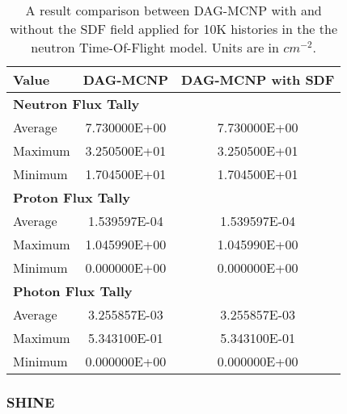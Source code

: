   \begin{table}[H]
    \small
    \begin{center}
      \begin{tabular}{lcc}
        \toprule
        Value   & DAG-MCNP     & DAG-MCNP with SDF      \\
        \toprule
        \multicolumn{3}{l}{\textbf{Neutron Flux Tally}} \\
        Average & 7.730000E+00 & 7.730000E+00           \\
        Maximum & 3.250500E+01 & 3.250500E+01           \\
        Minimum & 1.704500E+01 & 1.704500E+01           \\
        \multicolumn{3}{l}{\textbf{Proton Flux Tally}}  \\
        Average & 1.539597E-04 & 1.539597E-04           \\
        Maximum & 1.045990E+00 & 1.045990E+00           \\
        Minimum & 0.000000E+00 & 0.000000E+00           \\
        \multicolumn{3}{l}{\textbf{Photon Flux Tally}}  \\
        Average & 3.255857E-03 & 3.255857E-03           \\
        Maximum & 5.343100E-01 & 5.343100E-01           \\
        Minimum & 0.000000E+00 & 0.000000E+00           \\
        \bottomrule
      \end{tabular}
    \end{center}
    \caption[Results of flux mesh tallies for several particle types in the nTOF
      model.]{A result comparison between DAG-MCNP with and without the SDF field
      applied for 10K histories in the the neutron Time-Of-Flight model. Units are
      in $cm^{-2}$.}
  \end{table}
  
  \subsubsection{SHINE}
  
